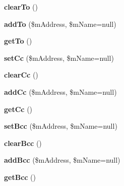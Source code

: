 \begin{DoxyCompactItemize}
\item 
\hypertarget{class_mail_a5bdad4b952efe194b8aab1b44cb95884}{{\bfseries clear\-To} ()}\label{class_mail_a5bdad4b952efe194b8aab1b44cb95884}

\item 
\hypertarget{class_mail_af786ff7fddcbc2e777c8f4568690cf99}{{\bfseries add\-To} (\$m\-Address, \$m\-Name=null)}\label{class_mail_af786ff7fddcbc2e777c8f4568690cf99}

\item 
\hypertarget{class_mail_a641c7291c513d881b6c62feff623a56c}{{\bfseries get\-To} ()}\label{class_mail_a641c7291c513d881b6c62feff623a56c}

\item 
\hypertarget{class_mail_a5007b3dcbd186f0eaefe4dde1fb9466e}{{\bfseries set\-Cc} (\$m\-Address, \$m\-Name=null)}\label{class_mail_a5007b3dcbd186f0eaefe4dde1fb9466e}

\item 
\hypertarget{class_mail_ac08c8f854ba95dd2f595864128083a63}{{\bfseries clear\-Cc} ()}\label{class_mail_ac08c8f854ba95dd2f595864128083a63}

\item 
\hypertarget{class_mail_a58a93c7ac9bd757a70c13e3786ecd02f}{{\bfseries add\-Cc} (\$m\-Address, \$m\-Name=null)}\label{class_mail_a58a93c7ac9bd757a70c13e3786ecd02f}

\item 
\hypertarget{class_mail_a6222ecebb4fd5060f1ba55f0964811c3}{{\bfseries get\-Cc} ()}\label{class_mail_a6222ecebb4fd5060f1ba55f0964811c3}

\item 
\hypertarget{class_mail_af4025ca7e455f10f8ddceae684ac156e}{{\bfseries set\-Bcc} (\$m\-Address, \$m\-Name=null)}\label{class_mail_af4025ca7e455f10f8ddceae684ac156e}

\item 
\hypertarget{class_mail_a4eb66291ed5c42b710d94b05cf90446f}{{\bfseries clear\-Bcc} ()}\label{class_mail_a4eb66291ed5c42b710d94b05cf90446f}

\item 
\hypertarget{class_mail_a937af64fe6514b6af2ae85f28069eeb4}{{\bfseries add\-Bcc} (\$m\-Address, \$m\-Name=null)}\label{class_mail_a937af64fe6514b6af2ae85f28069eeb4}

\item 
\hypertarget{class_mail_a52604e29060693f1146c0bf8a4e95b1d}{{\bfseries get\-Bcc} ()}\label{class_mail_a52604e29060693f1146c0bf8a4e95b1d}


\end{DoxyCompactItemize}
